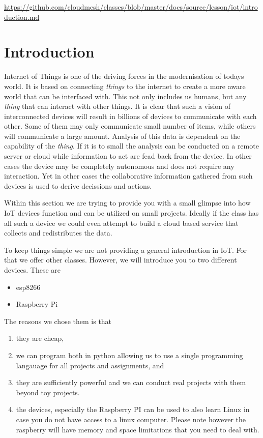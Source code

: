 \begin{fileremark}\url{https://github.com/cloudmesh/classes/blob/master/docs/source/lesson/iot/introduction.md}\end{fileremark}
\section{Introduction}\label{introduction}

Internet of Things is one of the driving forces in the modernisation of
todays world. It is based on connecting \emph{things} to the internet to
create a more aware world that can be interfaced with. This not only
includes us humans, but any \emph{thing} that can interact with other
things. It is clear that such a vision of interconnected devices will
result in billions of devices to communicate with each other. Some of
them may only communicate small number of items, while others will
communicate a large amount. Analysis of this data is dependent on the
capability of the \emph{thing}. If it is to small the analysis can be
conducted on a remote server or cloud while information to act are fead
back from the device. In other cases the device may be completely
autonomous and does not require any interaction. Yet in other cases the
collaborative information gathered from such devices is used to derive
decissions and actions.

Within this section we are trying to provide you with a small glimpse
into how IoT devices function and can be utilized on small projects.
Ideally if the class has all such a device we could even attempt to
build a cloud based service that collects and redistributes the data.

To keep things simple we are not providing a general introduction in
IoT. For that we offer other classes. However, we will introduce you to
two different devices. These are

\begin{itemize}
\tightlist
\item
  esp8266
\item
  Raspberry Pi
\end{itemize}

The reasons we chose them is that

\begin{enumerate}
\def\labelenumi{\arabic{enumi}.}
\tightlist
\item
  they are cheap,
\item
  we can program both in python allowing us to use a single programming
  langauage for all projects and assignments, and
\item
  they are sufficiently powerful and we can conduct real projects with
  them beyond toy projects.
\item
  the devices, especially the Raspberry PI can be used to also learn
  Linux in case you do not have access to a linux computer. Please note
  however the raspberry will have memory and space limitations that you
  need to deal with.
\end{enumerate}

